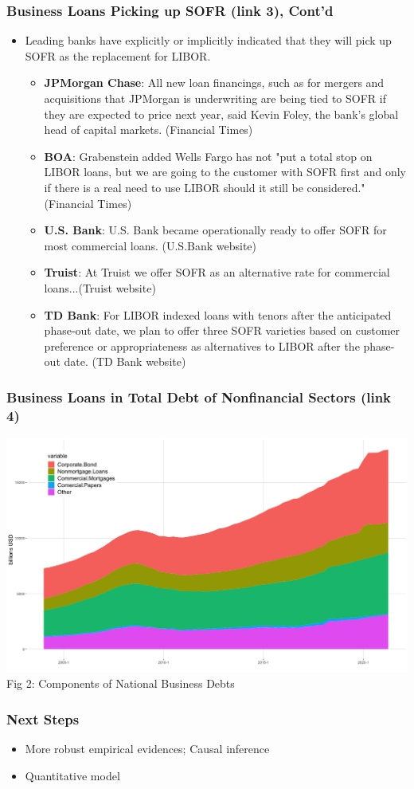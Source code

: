 \documentclass[10pt]{beamer}
\begin{document}
\begin{frame}
\frametitle{Business Loans Picking up SOFR (link 3),  Cont'd}
\begin{itemize}
\item Leading banks have explicitly or implicitly indicated that they will pick up SOFR as the replacement for LIBOR.
\begin{itemize}
\item \textbf{JPMorgan Chase}: All new loan financings, such as for mergers and acquisitions that JPMorgan is underwriting are being tied to SOFR if they are expected to price next year, said Kevin Foley, the bank's global head of capital markets. (Financial Times)
\item \textbf{BOA}: Grabenstein added Wells Fargo has not "put a total stop on LIBOR loans, but we are going to the customer with SOFR first and only if there is a real need to use LIBOR should it still be considered." (Financial Times)
\item \textbf{U.S.  Bank}: U.S. Bank became operationally ready to offer SOFR for most commercial loans.  (U.S.Bank website)
\item \textbf{Truist}: At Truist we offer SOFR as an alternative rate for commercial loans...(Truist website)
\item \textbf{TD Bank}: For LIBOR indexed loans with tenors after the anticipated phase-out date, we plan to offer three SOFR varieties based on customer preference or appropriateness as alternatives to LIBOR after the phase-out date.  (TD Bank website)
\end{itemize}
\end{itemize}
\end{frame}


\begin{frame}
\frametitle{\large Business Loans in Total Debt of Nonfinancial Sectors (link 4)}
\begin{center}
\includegraphics[scale=.22]{businessdebt.png}\\
\tiny Fig 2: Components of National Business Debts
\end{center}
\end{frame}


\begin{frame}
\frametitle{Next Steps}
\begin{itemize}
\item More robust empirical evidences; Causal inference
\item Quantitative model
\end{itemize}
\end{frame}
\end{document}
